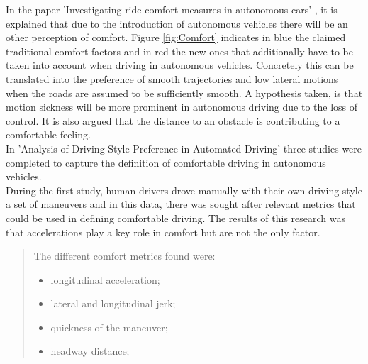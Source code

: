 In the paper 'Investigating ride comfort measures in autonomous cars' \cite{Elbanhawi2015}, it is explained that due to the introduction of autonomous vehicles there will be an other perception of comfort. Figure \ref{fig:Comfort} indicates in blue the claimed traditional comfort factors and in red the new ones that additionally have to be taken into account when driving in autonomous vehicles. Concretely this can be translated into the preference of smooth trajectories and low lateral motions when the roads are assumed to be sufficiently smooth. A hypothesis taken, is that motion sickness will be more prominent in autonomous driving due to the loss of control. It is also argued that the distance to an obstacle is contributing to a comfortable feeling.\\

In 'Analysis of Driving Style Preference in Automated Driving' \cite{Bellem} three studies were completed to capture the definition of comfortable driving in autonomous vehicles.\\
During the first study, human drivers drove manually with their own driving style a set of maneuvers and in this data, there was sought after relevant metrics that could be used in defining comfortable driving. The results of this research was that accelerations play a key role in comfort but are not the only factor. \cite{Bellem}

\begin{quote}
	The different comfort metrics found were:
	\begin{itemize}
		\item longitudinal acceleration;
		\item lateral and longitudinal jerk;
		\item quickness of the maneuver;
		\item headway distance;
	\end{itemize}
\end{quote}

